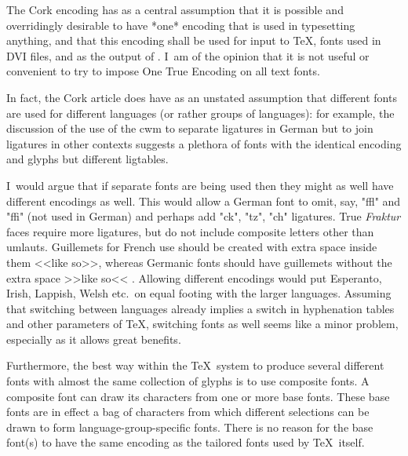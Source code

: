 

	The Cork encoding has as a central assumption that it is
	possible and overridingly desirable to have *one* encoding that
	is used in typesetting anything, and that this encoding shall be
	used for input to \TeX, fonts used in DVI files, and as the
	output of \MF.  I~am of the opinion that it is not useful or
	convenient to try to impose One True Encoding on all text fonts.

	In fact, the Cork article does have as an unstated assumption
	that different fonts are used for different languages (or rather
	groups of languages): for example, the discussion of the use of
	the cwm to separate ligatures in German but to join ligatures in
	other contexts suggests a plethora of fonts with the identical
	encoding and glyphs but different ligtables.

	I~would argue that if separate fonts are being used then they
	might as well have different encodings as well.  This would
	allow a German font to omit, say, "ffl" and "ffi" (not used in
	German) and perhaps add "ck", "tz", "ch" ligatures.  True {\it
	Fraktur} faces require more ligatures, but do not include
	composite letters other than umlauts.  Guillemets for French use
	should be created with extra space inside them <<\thinspace like
	so\thinspace>>, whereas Germanic fonts should have guillemets
	without the extra space >>like so<< \cite{Hart's102}.  Allowing
	different encodings would put Esperanto, Irish, Lappish, Welsh
	etc.\ on equal footing with the larger languages.  Assuming that
	switching between languages already implies a switch in
	hyphenation tables and other parameters of \TeX, switching fonts
	as well seems like a minor problem, especially as it allows
	great benefits.

	Furthermore, the best way within the \TeX\ system to produce
	several different fonts with almost the same collection of
	glyphs is to use composite fonts.  A composite font can draw its
	characters from one or more base fonts.  These base fonts are in
	effect a bag of characters from which different selections can
	be drawn to form language-group-specific fonts.  There is no
	reason for the base font(s) to have the same encoding as the
	tailored fonts used by \TeX\ itself.

\fi



